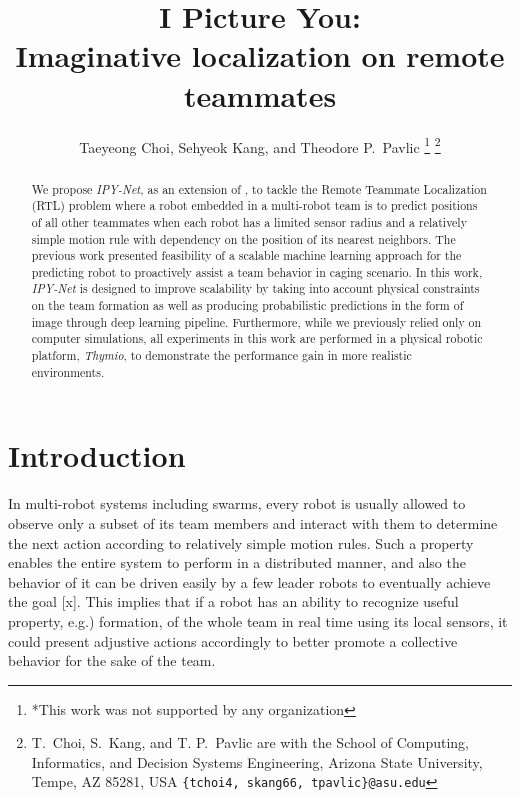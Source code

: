 \documentclass[letterpaper, 10 pt, conference]{ieeeconf}  %
\title{\LARGE \bf
	I Picture You: \\
	Imaginative localization on remote teammates
}
\author{Taeyeong Choi, Sehyeok Kang, and Theodore P.~Pavlic %
	\thanks{*This work was not supported by any organization}%
	\thanks{T.~Choi, S.~Kang, and T. P.~Pavlic are with the School of Computing, Informatics, and Decision Systems Engineering,
		Arizona State University, Tempe, AZ 85281, USA
		{\tt\small \{tchoi4, skang66, tpavlic\}@asu.edu}}%
}
\begin{document}
	
	
	
	\maketitle
	\thispagestyle{empty}
	\pagestyle{empty}
	
	
	\begin{abstract}
		
		We propose \emph{IPY-Net}, as an extension of \cite{Choi17}, to tackle the Remote Teammate 
		Localization (RTL) problem where a robot embedded in a multi-robot team is to predict positions 
		of all other teammates when each robot has a limited sensor radius and a 
		relatively simple motion rule with dependency on the position of its nearest neighbors. 
		The previous work presented feasibility of a scalable machine learning approach for the 
		predicting robot to proactively assist a team behavior in caging scenario. 
		In this work, \emph{IPY-Net} is designed to improve scalability by taking into account
		physical constraints on the team formation as well as producing probabilistic predictions  
		in the form of image through deep learning pipeline.
		Furthermore, while we previously relied only on computer simulations, 
		all experiments in this work are performed in a physical robotic platform, \emph{Thymio}, 
		to demonstrate the performance gain in more realistic environments. 
		
	\end{abstract}
	
	
	
	\section{Introduction}
	\label{sec:intro}
	
	In multi-robot systems including swarms, every robot is usually allowed to observe 
	only a subset of its team members and interact with them to determine the next action 
	according to relatively simple motion rules. 
	Such a property enables the entire system to perform in a distributed manner, and 
	also the behavior of it can be driven easily by a few leader robots to 
	eventually achieve the goal [x]. 
	This implies that if a robot has an ability to recognize useful property, e.g.) formation, 
	of the whole team in real time using its local sensors, 
	it could present adjustive actions accordingly to better promote a collective behavior 
	for the sake of the team.
	
\end{document}
